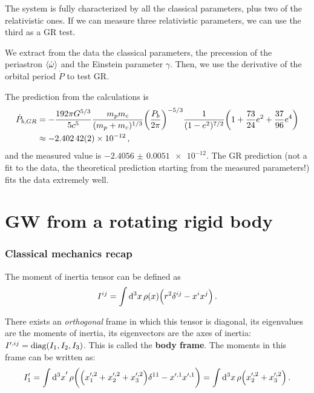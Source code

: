 \documentclass[main.tex]{subfiles}
\begin{document}
The system is fully characterized by all the classical parameters, plus two of the relativistic ones. 
If we can measure three relativistic parameters, we can use the third as a GR test.

We extract from the data the classical parameters, the precession of the periastron \(\expval{\dot{\omega}}\) and the Einstein parameter \(\gamma \). Then,  we use the derivative of the orbital period \(\dot{P}\) to test GR.

The prediction from the calculations is 
%
\begin{align}
\dot{P}_{b, GR} &= - \frac{192 \pi G^{5/3}}{5 c^{5}}
\frac{m_p m_c}{(m_p + m_c)^{1/3}} \qty( \frac{P_b}{2 \pi })^{- 5/3}
\frac{1}{(1 - e^2)^{7/2}} \qty(1 + \frac{73}{24} e^2 + \frac{37}{96}e^{4})  \\
&\approx -\num{2.40242(2)e-12}
\,,
\end{align}
%
and the measured value is \(- \num{2.4056(51)e-12}\).
The GR prediction (not a fit to the data, the theoretical prediction starting from the measured parameters!) fits the data extremely well.

\section{GW from a rotating rigid body}

\subsubsection{Classical mechanics recap}

The moment of inertia tensor can be defined as 
%
\begin{align}
I^{ij} = \int \dd[3]{x} \rho (x) \qty(r^2 \delta^{ij} - x^{i} x^{j})
\,.
\end{align}

There exists an \emph{orthogonal} frame in which this tensor is diagonal, its eigenvalues are the moments of inertia, its eigenvectors are the axes of inertia: \(I^{\prime, ij} = \text{diag}\qty(I_1 , I_2 , I_3 )\). This is called the \textbf{body frame}.
The moments in this frame can be written as: 
%
\begin{align}
I_1' = \int \dd[3]{x}' \rho \qty(\qty(x_1^{\prime, 2} + x_2^{\prime, 2} + x_3^{\prime, 2}) \delta^{11} - x^{\prime, 1} x^{\prime, 1})
= \int \dd[3]{x} \rho \qty(x_2^{\prime, 2} + x_3^{\prime, 2})
\,.
\end{align}
\end{document}
